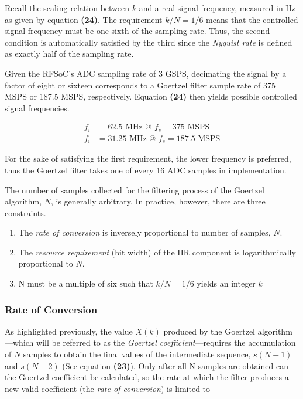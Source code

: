 \documentclass[reprint,amsmath,amssymb]{revtex4-2}
\begin{document}
Recall the scaling relation between $k$ and a real signal frequency, measured in Hz as given by equation \textbf{(24)}. The requirement $k/N = 1/6$ means that the controlled signal frequency must be one-sixth of the sampling rate. Thus, the second condition is automatically satisfied by the third since the \textit{Nyquist rate} is defined as exactly half of the sampling rate.

Given the RFSoC's ADC sampling rate of 3 GSPS, decimating the signal by a factor of eight or sixteen corresponds to a Goertzel filter sample rate of 375 MSPS or 187.5 MSPS, respectively. Equation \textbf{(24)} then yields possible controlled signal frequencies.

\begin{align}
    f_i & = 62.5 \text{ MHz @ } f_s = 375 \text{ MSPS} \nonumber \\
    f_i & = 31.25 \text{ MHz @ } f_s = 187.5 \text{ MSPS} \nonumber
\end{align}

For the sake of satisfying the first requirement, the lower frequency is preferred, thus the Goertzel filter takes one of every 16 ADC samples in implementation.

The number of samples collected for the filtering process of the Goertzel algorithm, $N$, is generally arbitrary. In practice, however, there are three constraints. 
\begin{enumerate}
    \item The \textit{rate of conversion} is inversely proportional to number of samples, $N$.
    \item The \textit{resource requirement} (bit width) of the IIR component is logarithmically proportional to $N$.
    \item N must be a multiple of six such that $k/N = 1/6$ yields an integer $k$
\end{enumerate}

\subsubsection{Rate of Conversion}

As highlighted previously, the value $X(k)$ produced by the Goertzel algorithm---which will be referred to as the \textit{Goertzel coefficient}---requires the accumulation of $N$ samples to obtain the final values of the intermediate sequence, $s(N-1)$ and $s(N-2)$ (See equation \textbf{(23)}). Only after all N samples are obtained can the Goertzel coefficient be calculated, so the rate at which the filter produces a new valid coefficient (the \textit{rate of conversion}) is limited to
\end{document}
